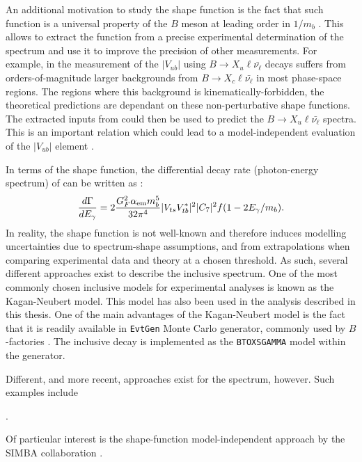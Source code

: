 An additional motivation to study the shape function is the fact that such function is a universal property of the $B$ meson at leading order in $1/m_b$ \cite{Neubert:1993um,Bigi:1993ex}.
This allows to extract the function from a precise experimental determination of the \BtoXsgamma spectrum and use it to improve the precision of other measurements.
For example, in the measurement of the $|V_{ub}|$ using $B\rightarrow X_u \ell \bar{\nu_{\ell}}$ decays suffers from orders-of-magnitude larger backgrounds from $B\rightarrow X_c \ell \bar{\nu_{\ell}}$ in most phase-space regions.
The regions where this background is kinematically-forbidden, the theoretical predictions are dependant on these non-perturbative shape functions.
The extracted inputs from \BtoXsgamma could then be used to predict the $B\rightarrow X_u \ell \bar{\nu_{\ell}}$ spectra.
This is an important relation which could lead to a model-independent evaluation of the $|V_{ub}|$ element \cite{Neubert:1993um}.


In terms of the shape function, the differential decay rate (photon-energy spectrum) of \BtoXsgamma can be written as \cite{BaBar:2014omp}:
\begin{equation}
    \frac{d\Gamma}{d{E_{\gamma}}} = 2\frac{G_F^2\alpha_{\mathrm{em}} m_b^5}{32\pi^4}|V_{ts}V_{tb}^*|^2 |C_7|^2 f(1-2{E_{\gamma}}/m_b).
\end{equation}
In reality, the shape function is not well-known and therefore induces modelling uncertainties due to spectrum-shape assumptions, and from extrapolations when comparing experimental data and theory at a chosen \Egamma threshold.
As such, several different approaches exist to describe the inclusive spectrum.
One of the most commonly chosen inclusive \BtoXsgamma models for experimental analyses is known as the Kagan-Neubert model.
This model has also been used in the analysis described in this thesis.
One of the main advantages of the Kagan-Neubert model is the fact that it is readily available in \texttt{EvtGen} Monte Carlo generator, commonly used by $B$-factories \cite{Ryd:2005zz}.
The \BtoXsgamma inclusive decay is implemented as the \texttt{BTOXSGAMMA} model within the generator.

Different, and more recent, approaches exist for the \BtoXsgamma spectrum, however.
Such examples include

.

Of particular interest is the shape-function model-independent approach by the SIMBA collaboration \cite{Bernlochner:2020jlt}.

